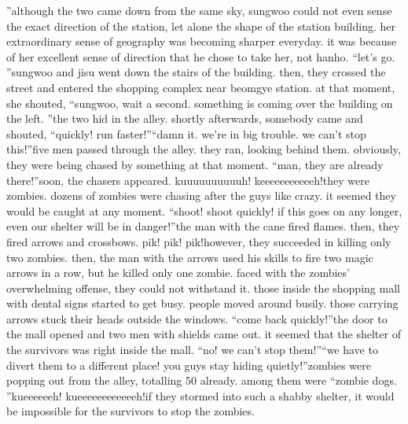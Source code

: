 ”although the two came down from the same sky, sungwoo could not even sense the exact direction of the station, let alone the shape of the station building.
her extraordinary sense of geography was becoming sharper everyday.
it was because of her excellent sense of direction that he chose to take her, not hanho.
“let’s go.
”sungwoo and jisu went down the stairs of the building.
 then, they crossed the street and entered the shopping complex near beomgye station.
at that moment, she shouted, “sungwoo, wait a second.
 something is coming over the building on the left.
”the two hid in the alley.
shortly afterwards, somebody came and shouted, “quickly! run faster!”“damn it.
 we’re in big trouble.
 we can’t stop this!”five men passed through the alley.
 they ran, looking behind them.
obviously, they were being chased by something at that moment.
“man, they are already there!”soon, the chasers appeared.
kuuuuuuuuuuh! keeeeeeeeeeeh!they were zombies.
 dozens of zombies were chasing after the guys like crazy.
it seemed they would be caught at any moment.
“shoot! shoot quickly! if this goes on any longer, even our shelter will be in danger!”the man with the cane fired flames.
 then, they fired arrows and crossbows.
pik! pik! pik!however, they succeeded in killing only two zombies.
 then, the man with the arrows used his skills to fire two magic arrows in a row, but he killed only one zombie.
faced with the zombies’ overwhelming offense, they could not withstand it.
those inside the shopping mall with dental signs started to get busy.
 people moved around busily.
 those carrying arrows stuck their heads outside the windows.
“come back quickly!”the door to the mall opened and two men with shields came out.
 it seemed that the shelter of the survivors was right inside the mall.
“no! we can’t stop them!”“we have to divert them to a different place! you guys stay hiding quietly!”zombies were popping out from the alley, totalling 50 already.
among them were “zombie dogs.
”kueeeeeeh! kueeeeeeeeeeeeh!if they stormed into such a shabby shelter, it would be impossible for the survivors to stop the zombies.


